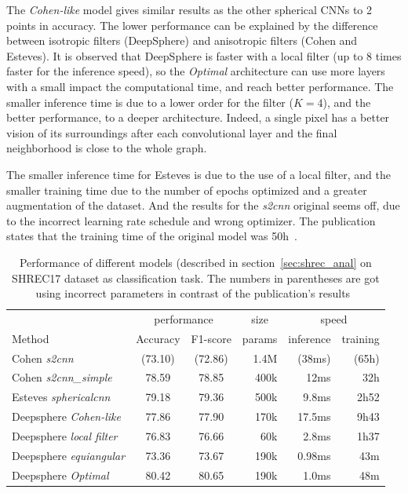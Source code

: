 \documentclass[11pt]{report}
\begin{document}
The \emph{Cohen-like} model gives similar results as the other spherical CNNs to 2 points in accuracy. The lower performance can be explained by the difference between isotropic filters (DeepSphere) and anisotropic filters (Cohen and Esteves). It is observed that DeepSphere is faster with a local filter (up to 8 times faster for the inference speed), so the \emph{Optimal} architecture can use more layers with a small impact the computational time, and reach better performance. The smaller inference time is due to a lower order for the filter ($K=4$), and the better performance, to a deeper architecture. Indeed, a single pixel has a better vision of its surroundings after each convolutional layer and the final neighborhood is close to the whole graph.

The smaller inference time for Esteves is due to the use of a local filter, and the smaller training time due to the number of epochs optimized and a greater augmentation of the dataset. And the results for the \emph{s2cnn} original seems off, due to the incorrect learning rate schedule and wrong optimizer. The publication states that the training time of the original model was 50h~\cite{cohen_convolutional_2017}.

\begin{table}[ht]
    \centering
    \begin{tabular}{l|c c r r r}
        \multicolumn{1}{l}{} & \multicolumn{2}{c}{performance} & \multicolumn{1}{c}{size} & \multicolumn{2}{c}{speed}\\
        \cmidrule(lr){2-3} \cmidrule(lr){4-4} \cmidrule(lr){5-6}
        \multicolumn{1}{l}{Method} & Accuracy & F1-score & params & inference & training \\ \hline
        Cohen \emph{s2cnn} & (73.10) & (72.86) & 1.4M & (38ms) & (65h)\\
        Cohen \emph{s2cnn\_simple} & 78.59 & 78.85 & 400k & 12ms & 32h\\
        Esteves \emph{sphericalcnn} & 79.18 & 79.36 & 500k & 9.8ms & 2h52\\ \hline
        Deepsphere \emph{Cohen-like} & 77.86 & 77.90 & 170k & 17.5ms & 9h43\\
        Deepsphere \emph{local filter} & 76.83 & 76.66 & 60k & 2.8ms & 1h37\\
        Deepsphere \emph{equiangular} & 73.36 & 73.67 & 190k & 0.98ms & 43m \\
        Deepsphere \emph{Optimal} & 80.42 & 80.65 & 190k & 1.0ms & 48m
    \end{tabular}
    \caption{Performance of different models (described in section~\ref{sec:shrec_anal} on SHREC17 dataset as classification task. The numbers in parentheses are got using incorrect parameters in contrast of the publication's results~\cite{cohen_spherical_2018}}
    \label{tab:SHREC17_class}
\end{table}
\end{document}
